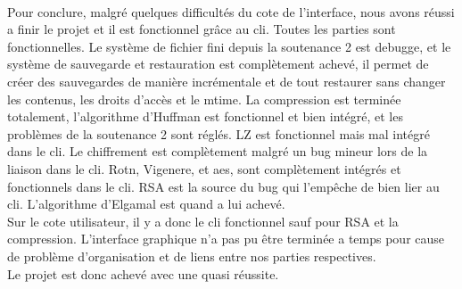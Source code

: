 \paragraph*{}
Pour conclure, malgré quelques difficultés du cote de l'interface, nous avons réussi a finir le projet et il est fonctionnel grâce au cli. Toutes les parties sont fonctionnelles. Le système de fichier fini depuis la soutenance 2 est debugge, et le système de sauvegarde et restauration est complètement achevé, il permet de créer des sauvegardes de manière incrémentale et de tout restaurer sans changer les contenus, les droits d'accès et le mtime. La compression est terminée totalement, l'algorithme d'Huffman est fonctionnel et bien intégré, et les problèmes de la soutenance 2 sont réglés. LZ est fonctionnel mais mal intégré dans le cli. Le chiffrement est complètement malgré un bug mineur lors de la liaison dans le cli. Rotn, Vigenere, et aes, sont complètement intégrés et fonctionnels dans le cli. RSA est la source du bug qui l'empêche de bien lier au cli. L'algorithme d'Elgamal est quand a lui achevé.\\
Sur le cote utilisateur, il y a donc le cli fonctionnel sauf pour RSA et la compression. L'interface graphique n'a pas pu être terminée a temps pour cause de problème d'organisation et de liens entre nos parties respectives.\\
Le projet est donc achevé avec une quasi réussite.
